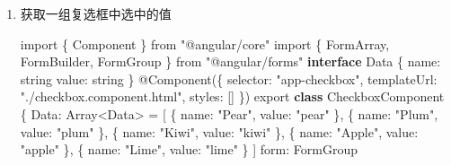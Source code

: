 \documentclass[
]{article}
\newenvironment{Shaded}{}{}
\newcommand{\BuiltInTok}[1]{#1}
\newcommand{\DataTypeTok}[1]{\textcolor[rgb]{0.56,0.13,0.00}{#1}}
\newcommand{\FunctionTok}[1]{\textcolor[rgb]{0.02,0.16,0.49}{#1}}
\newcommand{\ImportTok}[1]{#1}
\newcommand{\KeywordTok}[1]{\textcolor[rgb]{0.00,0.44,0.13}{\textbf{#1}}}
\newcommand{\NormalTok}[1]{#1}
\newcommand{\OperatorTok}[1]{\textcolor[rgb]{0.40,0.40,0.40}{#1}}
\newcommand{\OtherTok}[1]{\textcolor[rgb]{0.00,0.44,0.13}{#1}}
\newcommand{\StringTok}[1]{\textcolor[rgb]{0.25,0.44,0.63}{#1}}
\begin{document}
\begin{enumerate}
\def\labelenumi{\arabic{enumi}.}
\item
  获取一组复选框中选中的值

\begin{Shaded}
\end{Shaded}

\begin{Shaded}
\begin{Highlighting}[]
\ImportTok{import}\NormalTok{ \{ Component \} }\ImportTok{from} \StringTok{"@angular/core"}
\ImportTok{import}\NormalTok{ \{ FormArray}\OperatorTok{,}\NormalTok{ FormBuilder}\OperatorTok{,}\NormalTok{ FormGroup \} }\ImportTok{from} \StringTok{"@angular/forms"}
\KeywordTok{interface}\NormalTok{ Data \{}
  \DataTypeTok{name}\OperatorTok{:}\NormalTok{ string}
  \DataTypeTok{value}\OperatorTok{:}\NormalTok{ string}
\NormalTok{\}}
\NormalTok{@}\FunctionTok{Component}\NormalTok{(\{}
  \DataTypeTok{selector}\OperatorTok{:} \StringTok{"app{-}checkbox"}\OperatorTok{,}
  \DataTypeTok{templateUrl}\OperatorTok{:} \StringTok{"./checkbox.component.html"}\OperatorTok{,}
  \DataTypeTok{styles}\OperatorTok{:}\NormalTok{ []}
\NormalTok{\})}
\ImportTok{export} \KeywordTok{class}\NormalTok{ CheckboxComponent \{}
  \DataTypeTok{Data}\OperatorTok{:} \BuiltInTok{Array}\OperatorTok{\textless{}}\NormalTok{Data}\OperatorTok{\textgreater{}} \OperatorTok{=}\NormalTok{ [}
\NormalTok{    \{ }\DataTypeTok{name}\OperatorTok{:} \StringTok{"Pear"}\OperatorTok{,} \DataTypeTok{value}\OperatorTok{:} \StringTok{"pear"}\NormalTok{ \}}\OperatorTok{,}
\NormalTok{    \{ }\DataTypeTok{name}\OperatorTok{:} \StringTok{"Plum"}\OperatorTok{,} \DataTypeTok{value}\OperatorTok{:} \StringTok{"plum"}\NormalTok{ \}}\OperatorTok{,}
\NormalTok{    \{ }\DataTypeTok{name}\OperatorTok{:} \StringTok{"Kiwi"}\OperatorTok{,} \DataTypeTok{value}\OperatorTok{:} \StringTok{"kiwi"}\NormalTok{ \}}\OperatorTok{,}
\NormalTok{    \{ }\DataTypeTok{name}\OperatorTok{:} \StringTok{"Apple"}\OperatorTok{,} \DataTypeTok{value}\OperatorTok{:} \StringTok{"apple"}\NormalTok{ \}}\OperatorTok{,}
\NormalTok{    \{ }\DataTypeTok{name}\OperatorTok{:} \StringTok{"Lime"}\OperatorTok{,} \DataTypeTok{value}\OperatorTok{:} \StringTok{"lime"}\NormalTok{ \}}
\NormalTok{  ]}
  \DataTypeTok{form}\OperatorTok{:}\NormalTok{ FormGroup}


\end{Highlighting}
\end{Shaded}
\end{enumerate}
\end{document}
